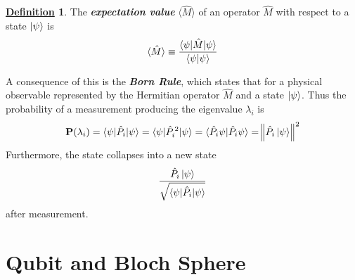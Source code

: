 \documentclass[11pt, answers]{exam}
\newcommand{\prob}{\textbf{P}}
\newcommand{\avg}[1]{\langle {#1} \rangle}
\theoremstyle{definition}
\newtheorem{definition}{\underline{Definition}}[section]
\theoremstyle{bulleted}
\begin{document}
	\begin{definition}
		The \textit{\textbf{expectation value}} $\avg{\hat{M}}$ of an operator $\hat{M}$ with respect to a state $\ket{\psi}$ is
		\begin{align*}
			\avg{\hat{M}} \equiv \frac{\braket{\psi | \hat{M} | \psi}}{\braket{\psi|\psi}}
		\end{align*}
	\end{definition}
	
	\noindent A consequence of this is the \textit{\textbf{Born Rule}}, which states that for a physical observable represented by the Hermitian operator $\hat{M}$ and a state $\ket{\psi}$. Thus the probability of a measurement producing the eigenvalue $\lambda_i$ is
	\begin{align*}
		\prob(\lambda_i) = \braket{\psi | \hat{P}_i | \psi} = \braket{\psi | \hat{P}_i^{\,2} | \psi} = \braket{\hat{P}_i\psi | \hat{P}_i\psi} = \norm{\hat{P}_i \ket{\psi}}^2
	\end{align*}
	Furthermore, the state collapses into a new state
	\begin{align*}
		\frac{\hat{P}_i\ket{\psi}}{\sqrt{\braket{\psi | \hat{P}_i | \psi}}}
	\end{align*}
	after measurement.
	
	\section{Qubit and Bloch Sphere}
\end{document}
